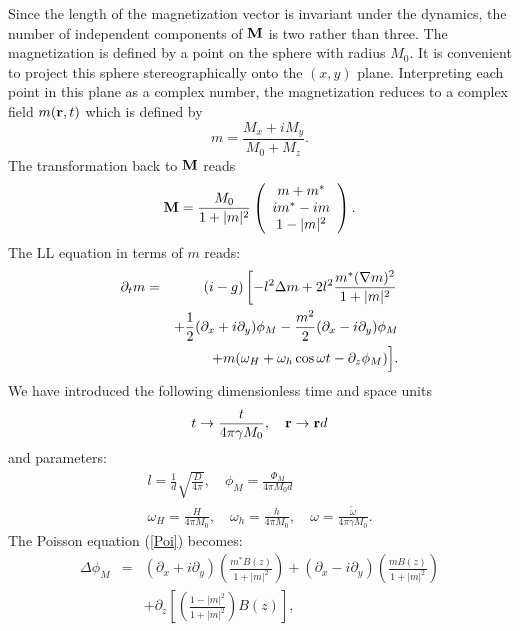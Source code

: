 Since the length of the magnetization vector is invariant under the
dynamics, the number of independent components of ${\bf M}$ is two
rather than three. The magnetization is defined by a point on the
sphere with radius $M_0$. It is convenient to project this sphere
stereographically onto the $(x,y)$ plane. Interpreting each point in
this plane as a complex number, the magnetization reduces to a
complex field $m({\bf r},t)$ which is defined by
\begin{equation}
  m=\frac{M_x+iM_y}{M_0+M_z}.
  \label{s.proj}
\end{equation}
The transformation back to ${\bf M}$ reads 
\begin{equation}
  {\bf M}=\frac{M_0}{1+|m|^2}
   \left(\begin{array}{c}m+m^*\\im^*-im\\1-|m|^2\end{array}\right).
  \label{m.to.M}
\end{equation}
The LL equation in terms of $m$ reads\cite{lak.84}:
\begin{eqnarray}
  \partial_tm&=&(i-g)\left[-l^2\Delta m+2l^2\frac{m^*(\nabla m)^2}
   {1+|m|^2}\right.\nonumber\\ &&+\frac{1}{2}(\partial_x+
   i\partial_y)\phi_M-\frac{m^2}{2}(\partial_x-i\partial_y)\phi_M
   \nonumber\\ &&+m(\omega_H+\omega_h\cos\omega t-\partial_z\phi_M)
   \Bigl].
  \label{LLeqP}
\end{eqnarray}
We have introduced the following dimensionless time and space units
\begin{equation}
 t\to\frac{t}{4\pi\gamma M_0},\quad{\bf r}\to{\bf r}d 
  \label{scale}
\end{equation}
and parameters:
\begin{equation}\begin{array}{c}
 l=\frac{\displaystyle 1}{\displaystyle d}\sqrt{
   \frac{\displaystyle D}{\displaystyle 4\pi}},\quad
 \phi_M=\frac{\displaystyle \Phi_M}{\displaystyle 4\pi M_0d}\\[2mm]
 \omega_H=\frac{\displaystyle H}{\displaystyle 4\pi M_0},\quad
 \omega_h=\frac{\displaystyle h}{\displaystyle 4\pi M_0},\quad
 \omega=\frac{\displaystyle \tilde{\omega}}{\displaystyle 4\pi
   \gamma M_0}. 
 \end{array}\label{param}
\end{equation}
The Poisson equation (\ref{Poi}) becomes:
\begin{eqnarray}
   \Delta\phi_M&=&(\partial_x+i\partial_y)\left(\frac{m^*B(z)}
   {1+|m|^2}\right)+(\partial_x-i\partial_y)\left(\frac{mB(z)}
   {1+|m|^2}\right)
   \nonumber\\&&+\partial_z\left[\left(\frac{1-|m|^2}{1+|m|^2}\right)
   B(z)\right],
  \label{PoiP}
\end{eqnarray}
